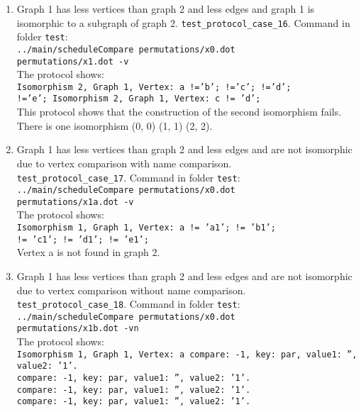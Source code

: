 \documentclass[12pt,a4paper]{report}
\begin{document}
\begin{enumerate}
  \item Graph 1 has less vertices than graph 2 and less edges and graph 1 is isomorphic to a subgraph of graph 2.
    \texttt{test\_protocol\_case\_16}. Command in folder \texttt{test}: \\
    \texttt{../main/scheduleCompare permutations/x0.dot \\ permutations/x1.dot -v} \\
    The protocol shows: \\
    \texttt{Isomorphism 2, Graph 1, Vertex: a !='b'; !='c'; !='d'; \\ !='e';
    Isomorphism 2, Graph 1, Vertex: c != 'd';} \\
    This protocol shows that the construction of the second isomorphism fails.
    There is one isomorphism (0, 0) (1, 1) (2, 2). 
  \item Graph 1 has less vertices than graph 2 and less edges and are not isomorphic due to vertex comparison with name comparison. \\
    \texttt{test\_protocol\_case\_17}. Command in folder \texttt{test}: \\
    \texttt{../main/scheduleCompare permutations/x0.dot \\ permutations/x1a.dot -v} \\
    The protocol shows: \\
    \texttt{Isomorphism 1, Graph 1, Vertex: a != 'a1'; != 'b1'; \\ != 'c1'; != 'd1'; != 'e1';} \\
    Vertex a is not found in graph 2.
  \item Graph 1 has less vertices than graph 2 and less edges and are not isomorphic due to vertex comparison without name comparison. \\
    \texttt{test\_protocol\_case\_18}. Command in folder \texttt{test}: \\
    \texttt{../main/scheduleCompare permutations/x0.dot \\ permutations/x1b.dot -vn} \\
    The protocol shows: \\
    \texttt{Isomorphism 1, Graph 1, Vertex: a compare: -1, key: par, value1: '', value2: '1'. \\
    compare: -1, key: par, value1: '', value2: '1'. \\
    compare: -1, key: par, value1: '', value2: '1'. \\
    compare: -1, key: par, value1: '', value2: '1'. \\
}
\end{enumerate}
\end{document}
